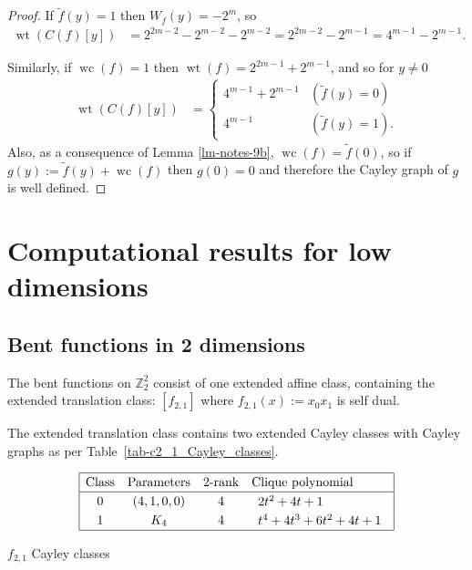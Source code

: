 \documentclass[12pt,a4paper]{article}
\newcommand{\mb}[1]{\mathbb{#1}}
\newcommand{\Z}{\mb{Z}}
\newcommand{\dual}[1]{\widetilde{#1}}
\newcommand{\weight}[1]{\operatorname{wt}\left(#1\right)}
\newcommand{\weightclass}[1]{\operatorname{wc}\left(#1\right)}
\begin{document}
\begin{proof}
If $\dual{f}(y) = 1$ then $W_f(y) = -2^m$, so
\begin{align*}
\weight{C(f)[y]}
&=
2^{2m-2}-2^{m-2} - 2^{m-2}
=
2^{2m-2} - 2^{m-1}
=
4^{m-1} - 2^{m-1}.
\end{align*}

Similarly, if $\weightclass{f} = 1$ then $\weight{f} = 2^{2m-1}+2^{m-1}$,
and so for $y \neq 0$
\begin{align*}
\weight{C(f)[y]}
&=
\begin{cases}
4^{m-1} + 2^{m-1} & (\dual{f}(y)=0)
\\
4^{m-1}           & (\dual{f}(y)=1).
\end{cases}
\end{align*}
Also, as a consequence of Lemma \ref{lm-notes-9b}, $\weightclass{f} = \dual{f}(0)$,
so if $g(y) := \dual{f}(y) + \weightclass{f}$ then $g(0)=0$ and therefore the Cayley graph of $g$
is well defined.
\end{proof}


\section{Computational results for low dimensions}
\label{sec-Empirical}
\subsection{Bent functions in 2 dimensions}

The bent functions on $\Z_2^2$ consist of one extended affine class, containing the extended translation class: $[f_{2,1}]$
where $f_{2,1}(x) := x_0 x_1$ is self dual.

The extended translation class contains two extended Cayley classes with Cayley graphs as per Table~\ref{tab-c2_1_Cayley_classes}.
\begin{table}[!hb]
\begin{align*}
\def\arraystretch{1.2}
\begin{array}{|cccl|}
\hline
\text{Class} &
\text{Parameters} &
\text{2-rank} &
\text{Clique polynomial}
\\
\hline
0 &
(4, 1, 0, 0) &
4 &
\begin{array}{l}
2t^{2} + 4t + 1
\end{array}
\\
1 &
K_4 &
4 &
\begin{array}{l}
t^{4} + 4t^{3} + 6t^{2} + 4t + 1
\end{array}
\\
\hline
\end{array}
\end{align*}
\caption{$f_{2,1}$ Cayley classes}
\label{tab-c2_1_Cayley_classes}
\end{table}
\end{document}
